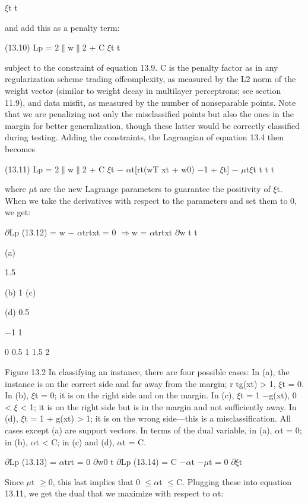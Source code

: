 $\xi$t t

and add this as a penalty term:

(13.10) Lp = 2$\parallel$w$\parallel$2 + C $\xi$t t

subject to the constraint of equation 13.9. C is the penalty factor as in any regularization scheme trading offcomplexity, as measured by the L2 norm of the weight vector (similar to weight decay in multilayer perceptrons; see section 11.9), and data misfit, as measured by the number of nonseparable points. Note that we are penalizing not only the misclassified points but also the ones in the margin for better generalization, though these latter would be correctly classified during testing. Adding the constraints, the Lagrangian of equation 13.4 then becomes

(13.11) Lp = 2$\parallel$w$\parallel$2 + C $\xi$t $-$ $\alpha$t[rt(wT xt + w0) $-$1 + $\xi$t] $-$ $\mu$t$\xi$t t t t

where $\mu$t are the new Lagrange parameters to guarantee the positivity of $\xi$t. When we take the derivatives with respect to the parameters and set them to 0, we get:

$\partial$Lp (13.12) = w $-$ $\alpha$trtxt = 0 $\Rightarrow$w = $\alpha$trtxt $\partial$w t t

(a)

1.5

(b) 1 (c)

(d) 0.5

$-$1 1

0 0.5 1 1.5 2

Figure 13.2 In classifying an instance, there are four possible cases: In (a), the instance is on the correct side and far away from the margin; r tg(xt) > 1, $\xi$t = 0. In (b), $\xi$t = 0; it is on the right side and on the margin. In (c), $\xi$t = 1 $-$g(xt), 0 < $\xi$ < 1; it is on the right side but is in the margin and not sufficiently away. In (d), $\xi$t = 1 + g(xt) > 1; it is on the wrong side---this is a misclassification. All cases except (a) are support vectors. In terms of the dual variable, in (a), $\alpha$t = 0; in (b), $\alpha$t < C; in (c) and (d), $\alpha$t = C.

$\partial$Lp (13.13) = $\alpha$trt = 0 $\partial$w0 t $\partial$Lp (13.14) = C $-$$\alpha$t $-$$\mu$t = 0 $\partial$$\xi$t

Since $\mu$t $\geq$0, this last implies that 0 $\leq$$\alpha$t $\leq$C. Plugging these into equation 13.11, we get the dual that we maximize with respect to $\alpha$t:

